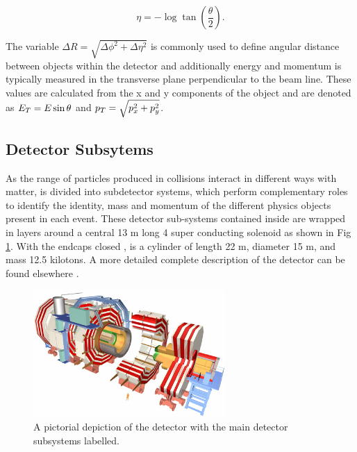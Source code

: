 \begin{equation}
\eta = -\log\tan\left(\frac{\theta}{2}\right).
\end{equation}

The variable $\Delta R = \sqrt{\Delta\phi^{2} + \Delta\eta^{2} } $ is commonly used to define angular distance between objects within the detector and additionally energy and momentum is typically measured in the transverse plane perpendicular to the beam line. These values are calculated from the x and y components of the object and are denoted as $E_{T} = E\sin\theta$ and $p_{T} = \sqrt{p^{2}_{x}+p^{2}_{y}}$. 

\subsection{Detector Subsytems}
\label{subsec:detectorsubsystems}

As the range of particles produced in \pp collisions interact in different ways with matter, \CMS is divided into subdetector systems, which perform complementary roles to identify the identity, mass and momentum of the different physics objects present in each event. These detector sub-systems contained inside \CMS are wrapped in layers around a central 13 m long 4 \T super conducting solenoid as shown in Fig \ref{fig:cms-detector}. With the endcaps closed , \CMS is a cylinder of length 22 m, diameter 15 m, and mass 12.5 kilotons. A more detailed complete description of the detector can be found elsewhere \cite{cmstdr}. \\

\begin{figure}[!h]

\centering
\includegraphics[width=0.65\textwidth]{plots/cms-detector.png}
\caption[A pictorial depiction of the \CMS detector.]{A pictorial depiction of the \CMS detector with the main detector subsystems labelled.   \cite{cms-public-detector}}  
\label{fig:cms-detector}
\end{figure}

